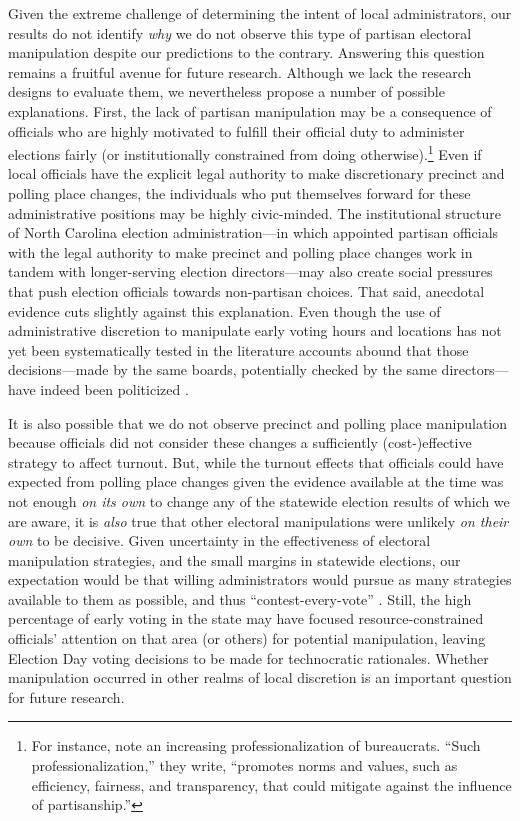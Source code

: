 \documentclass[12pt]{article}
\begin{document}
Given the extreme challenge of determining the intent of local administrators, our results do not identify \emph{why} we do not observe this type of partisan electoral manipulation despite our predictions to the contrary. Answering this question remains a fruitful avenue for future research. Although we lack the research designs to evaluate them, we nevertheless propose a number of possible explanations. First, the lack of partisan manipulation may be a consequence of officials who are highly motivated to fulfill their official duty to administer elections fairly (or institutionally constrained from doing otherwise).\footnote{For instance, \cite{kropfPAR} note an increasing professionalization of bureaucrats.  ``Such professionalization,'' they write, ``promotes norms and values, such as efficiency, fairness, and transparency, that could mitigate against the influence of partisanship.''} Even if local officials have the explicit legal authority to make discretionary precinct and polling place changes, the individuals who put themselves forward for these administrative positions may be highly civic-minded. The institutional structure of North Carolina election administration---in which appointed partisan officials with the legal authority to make precinct and polling place changes work in tandem with longer-serving election directors---may also create social pressures that push election officials towards non-partisan choices. That said, anecdotal evidence cuts slightly against this explanation.  Even though the use of administrative discretion to manipulate early voting hours and locations has not yet been systematically tested in the literature accounts abound that those decisions---made by the same boards, potentially checked by the same directors---have indeed been politicized \citep{campbell2016,campbell2016c}.

It is also possible that we do not observe precinct and polling place manipulation because officials did not consider these changes a sufficiently (cost-)effective strategy to affect turnout.  But, while the turnout effects that officials could have expected from polling place changes given the evidence available at the time \citep{brady2011turning} was not enough \emph{on its own} to change any of the statewide election results of which we are aware, it is \emph{also} true that other electoral manipulations were unlikely \emph{on their own} to be decisive.  Given uncertainty in the effectiveness of electoral manipulation strategies, and the small margins in statewide elections, our expectation would be that willing administrators would pursue as many strategies available to them as possible, and thus ``contest-every-vote'' \citep{phillips2016,jacobs}.  Still, the high percentage of early voting in the state may have focused resource-constrained officials' attention on that area (or others) for potential manipulation, leaving Election Day voting decisions to be made for technocratic rationales.  Whether manipulation occurred in other realms of local discretion is an important question for future research.
\end{document}
